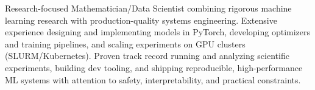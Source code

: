\documentclass[10pt,a4paper]{altacv}
\begin{document}

\begin{fullwidth}
\makecvheader
{\small Research-focused Mathematician/Data Scientist combining rigorous machine learning research with production-quality systems engineering. Extensive experience designing and implementing models in PyTorch, developing optimizers and training pipelines, and scaling experiments on GPU clusters (SLURM/Kubernetes). Proven track record running and analyzing scientific experiments, building dev tooling, and shipping reproducible, high-performance ML systems with attention to safety, interpretability, and practical constraints.}
\vspace{-4pt}
\end{fullwidth}


\setlength{\parskip}{0pt}


\end{document}
